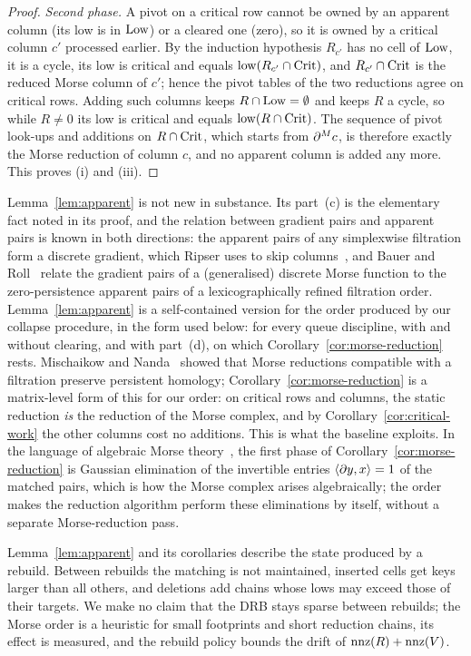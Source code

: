 \begin{proof}
\emph{Second phase.} A pivot on a critical row cannot be owned by an apparent
column (its low is in $\mathrm{Low}$) or a cleared one (zero), so it is owned by a
critical column $c'$ processed earlier. By the induction hypothesis $R_{c'}$ has
no cell of $\mathrm{Low}$, it is a cycle, its low is critical and equals
$\operatorname{low}(R_{c'}\cap\mathrm{Crit})$, and $R_{c'}\cap\mathrm{Crit}$ is the reduced Morse column of
$c'$; hence the pivot tables of the two reductions agree on critical rows.
Adding such columns keeps $R\cap\mathrm{Low}=\emptyset$ and keeps $R$ a cycle, so while
$R\ne0$ its low is critical and equals $\operatorname{low}(R\cap\mathrm{Crit})$. The sequence of pivot
look-ups and additions on $R\cap\mathrm{Crit}$, which starts from $\partial^{M} c$, is therefore
exactly the Morse reduction of column $c$, and no apparent column is added any
more. This proves (i) and (iii).
\end{proof}

\begin{remark}\label{rem:morse-literature}
Lemma~\ref{lem:apparent} is not new in substance. Its part~(c) is the
elementary fact noted in its proof, and the relation between gradient pairs and
apparent pairs is known in both directions: the apparent pairs of any
simplexwise filtration form a discrete gradient, which Ripser uses to skip
columns~\cite{bauer2021ripser}, and Bauer and Roll~\cite{bauer2024wrapping}
relate the gradient pairs of a (generalised) discrete Morse function to the
zero-persistence apparent pairs of a lexicographically refined filtration
order. Lemma~\ref{lem:apparent} is a self-contained version for the order
produced by our collapse procedure, in the form used below: for every queue
discipline, with and without clearing, and with part~(d), on which
Corollary~\ref{cor:morse-reduction} rests. Mischaikow and Nanda~\cite{mischaikow2013morse} showed that
Morse reductions compatible with a filtration preserve persistent homology;
Corollary~\ref{cor:morse-reduction} is a matrix-level form of this for our order:
on critical rows and columns, the static reduction \emph{is} the reduction of
the Morse complex, and by Corollary~\ref{cor:critical-work} the other columns
cost no additions. This is what the  baseline exploits. In the
language of algebraic Morse theory~\cite{skoldberg2006morse,jollenbeck2009minimal},
the first phase of
Corollary~\ref{cor:morse-reduction} is Gaussian elimination of the invertible
entries $\langle\partial y,x\rangle=1$ of the matched pairs, which is how the Morse
complex arises algebraically; the order makes the reduction algorithm perform
these eliminations by itself, without a separate Morse-reduction pass.
\end{remark}

\begin{remark}[Scope]\label{rem:morse-scope}
Lemma~\ref{lem:apparent} and its corollaries describe the state produced by a
rebuild. Between rebuilds the matching is not maintained, inserted cells get
keys larger than all others, and deletions add chains whose lows may exceed
those of their targets. We make no claim that the DRB stays sparse between
rebuilds; the Morse order is a heuristic for small footprints and short
reduction chains, its effect is measured, and the rebuild policy bounds the
drift of $\operatorname{nnz}(R)+\operatorname{nnz}(V)$.
\end{remark}
